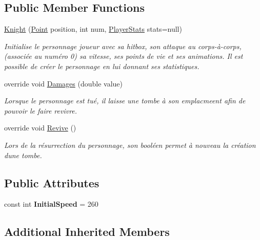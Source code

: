 \subsection*{Public Member Functions}
\begin{DoxyCompactItemize}
\item 
\hyperlink{class_tentacle_slicers_1_1customs_1_1_knight_ad7f2859f506368ab55ffae03324220ae}{Knight} (\hyperlink{class_tentacle_slicers_1_1general_1_1_point}{Point} position, int num, \hyperlink{class_tentacle_slicers_1_1actors_1_1_player_stats}{Player\+Stats} stats=null)
\begin{DoxyCompactList}\small\item\em Initialise le personnage joueur avec sa hitbox, son attaque au corps-\/à-\/corps, (associée au numéro 0) sa vitesse, ses points de vie et ses animations. Il est possible de créer le personnage en lui donnant ses statistiques. \end{DoxyCompactList}\item 
override void \hyperlink{class_tentacle_slicers_1_1customs_1_1_knight_aa910b96f987e5aba0fb93b2aeabe6261}{Damages} (double value)
\begin{DoxyCompactList}\small\item\em Lorsque le personnage est tué, il laisse une tombe à son emplacmeent afin de pouvoir le faire revivre. \end{DoxyCompactList}\item 
override void \hyperlink{class_tentacle_slicers_1_1customs_1_1_knight_a32666ab0b1401a669d4c32237c310c3e}{Revive} ()
\begin{DoxyCompactList}\small\item\em Lors de la résurrection du personnage, son booléen permet à nouveau la création d\textquotesingle{}une tombe. \end{DoxyCompactList}\end{DoxyCompactItemize}
\subsection*{Public Attributes}
\begin{DoxyCompactItemize}
\item 
\mbox{\label{class_tentacle_slicers_1_1customs_1_1_knight_ab8c50b71a8d2b5e5d4b9050f7c4962ba}} 
const int {\bfseries Initial\+Speed} = 260
\end{DoxyCompactItemize}
\subsection*{Additional Inherited Members}


